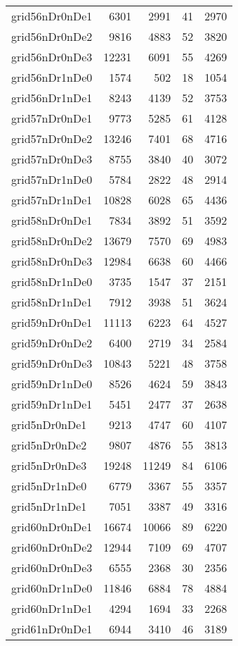 \begin{longtable}{lrrrr}
grid56nDr0nDe1 & 6301 & 2991 & 41 & 2970 \\
grid56nDr0nDe2 & 9816 & 4883 & 52 & 3820 \\
grid56nDr0nDe3 & 12231 & 6091 & 55 & 4269 \\
grid56nDr1nDe0 & 1574 & 502 & 18 & 1054 \\
grid56nDr1nDe1 & 8243 & 4139 & 52 & 3753 \\
grid57nDr0nDe1 & 9773 & 5285 & 61 & 4128 \\
grid57nDr0nDe2 & 13246 & 7401 & 68 & 4716 \\
grid57nDr0nDe3 & 8755 & 3840 & 40 & 3072 \\
grid57nDr1nDe0 & 5784 & 2822 & 48 & 2914 \\
grid57nDr1nDe1 & 10828 & 6028 & 65 & 4436 \\
grid58nDr0nDe1 & 7834 & 3892 & 51 & 3592 \\
grid58nDr0nDe2 & 13679 & 7570 & 69 & 4983 \\
grid58nDr0nDe3 & 12984 & 6638 & 60 & 4466 \\
grid58nDr1nDe0 & 3735 & 1547 & 37 & 2151 \\
grid58nDr1nDe1 & 7912 & 3938 & 51 & 3624 \\
grid59nDr0nDe1 & 11113 & 6223 & 64 & 4527 \\
grid59nDr0nDe2 & 6400 & 2719 & 34 & 2584 \\
grid59nDr0nDe3 & 10843 & 5221 & 48 & 3758 \\
grid59nDr1nDe0 & 8526 & 4624 & 59 & 3843 \\
grid59nDr1nDe1 & 5451 & 2477 & 37 & 2638 \\
grid5nDr0nDe1 & 9213 & 4747 & 60 & 4107 \\
grid5nDr0nDe2 & 9807 & 4876 & 55 & 3813 \\
grid5nDr0nDe3 & 19248 & 11249 & 84 & 6106 \\
grid5nDr1nDe0 & 6779 & 3367 & 55 & 3357 \\
grid5nDr1nDe1 & 7051 & 3387 & 49 & 3316 \\
grid60nDr0nDe1 & 16674 & 10066 & 89 & 6220 \\
grid60nDr0nDe2 & 12944 & 7109 & 69 & 4707 \\
grid60nDr0nDe3 & 6555 & 2368 & 30 & 2356 \\
grid60nDr1nDe0 & 11846 & 6884 & 78 & 4884 \\
grid60nDr1nDe1 & 4294 & 1694 & 33 & 2268 \\
grid61nDr0nDe1 & 6944 & 3410 & 46 & 3189 \\

\end{longtable}
